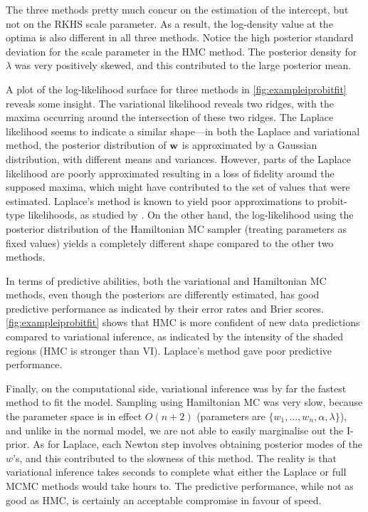 The three methods pretty much concur on the estimation of the intercept, but not on the RKHS scale parameter.
As a result, the log-density value at the optima is also different in all three methods.
Notice the high posterior standard deviation for the scale parameter in the HMC method.
The posterior density for $\lambda$ was very positively skewed, and this contributed to the large posterior mean.

A plot of the log-likelihood surface for three methods in \cref{fig:exampleiprobitfit} reveals some insight.
The variational likelihood reveals two ridges, with the maxima occurring around the intersection of these two ridges.
The Laplace likelihood seems to indicate a similar shape---in both the Laplace and variational method, the posterior distribution of ${\mathbf w}$ is approximated by a Gaussian distribution, with different means and variances.
However, parts of the Laplace likelihood are poorly approximated resulting in a loss of fidelity around the supposed maxima, which might have contributed to the set of values that were estimated.
Laplace's method is known to yield poor approximations to probit-type likelihoods, as studied by \citet{kuss2005assessing}.
On the other hand, the log-likelihood using the posterior distribution of the Hamiltonian MC sampler (treating parameters as fixed values) yields a completely different shape compared to the other two methods.

In terms of predictive abilities, both the variational and Hamiltonian MC methods, even though the posteriors are differently estimated, has good predictive performance as indicated by their error rates and Brier scores.
\cref{fig:exampleiprobitfit} shows that HMC is more confident of new data predictions compared to variational inference, as indicated by the intensity of the shaded regions (HMC is stronger than VI).
Laplace's method gave poor predictive performance.

Finally, on the computational side, variational inference was by far the fastest method to fit the model.
Sampling using Hamiltonian MC was very slow, because the parameter space is in effect $O(n + 2)$ (parameters are $\{w_1,\dots,w_n,\alpha,\lambda\}$), and unlike in the normal model, we are not able to easily marginalise out the I-prior.
As for Laplace, each Newton step involves obtaining posterior modes of the $w$'s, and this contributed to the slowness of this method.
The reality is that variational inference takes seconds to complete what either the Laplace or full MCMC methods would take hours to.
The predictive performance, while not as good as HMC, is certainly an acceptable compromise in favour of speed.

